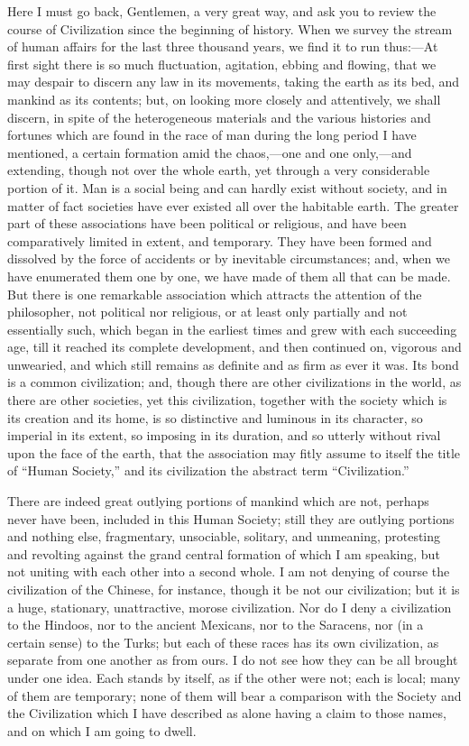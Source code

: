 Here I must go back, Gentlemen, a very great way, and ask you to
review the course of Civilization since the beginning of history. When
we survey the stream of human affairs for the last three thousand
years, we find it to run thus:—At first sight there is so much
fluctuation, agitation, ebbing and flowing, that we may despair to
discern any law in its movements, taking the earth as its bed,
and mankind as its contents; but, on looking more closely and
attentively, we shall discern, in spite of the heterogeneous materials
and the various histories and fortunes which are found in the race of
man during the long period I have mentioned, a certain formation amid
the chaos,—one and one only,—and extending, though not over the
whole earth, yet through a very considerable portion of it. Man is a
social being and can hardly exist without society, and in matter of
fact societies have ever existed all over the habitable earth. The
greater part of these associations have been political or religious,
and have been comparatively limited in extent, and temporary. They
have been formed and dissolved by the force of accidents or by
inevitable circumstances; and, when we have enumerated them one by
one, we have made of them all that can be made. But there is one
remarkable association which attracts the attention of the
philosopher, not political nor religious, or at least only partially
and not essentially such, which began in the earliest times and grew
with each succeeding age, till it reached its complete development,
and then continued on, vigorous and unwearied, and which still remains
as definite and as firm as ever it was. Its bond is a common
civilization; and, though there are other civilizations in the world,
as there are other societies, yet this civilization, together with the
society which is its creation and its home, is so distinctive and
luminous in its character, so imperial in its extent, so imposing in
its duration, and so utterly without rival upon the face of the earth,
that the association may fitly assume to itself the title of
``Human Society,'' and its civilization the abstract term
``Civilization.''

There are indeed great outlying portions of mankind which are not,
perhaps never have been, included in this Human Society; still
they are outlying portions and nothing else, fragmentary, unsociable,
solitary, and unmeaning, protesting and revolting against the grand
central formation of which I am speaking, but not uniting with each
other into a second whole. I am not denying of course the civilization
of the Chinese, for instance, though it be not our civilization; but
it is a huge, stationary, unattractive, morose civilization. Nor do I
deny a civilization to the Hindoos, nor to the ancient Mexicans, nor
to the Saracens, nor (in a certain sense) to the Turks; but each of
these races has its own civilization, as separate from one another as
from ours. I do not see how they can be all brought under one idea.
Each stands by itself, as if the other were not; each is local; many
of them are temporary; none of them will bear a comparison with the
Society and the Civilization which I have described as alone having a
claim to those names, and on which I am going to dwell.

